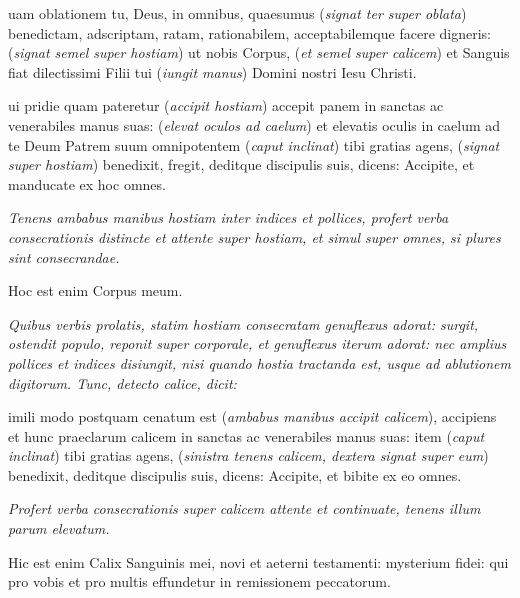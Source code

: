 uam oblationem tu, Deus, in omnibus, quaesumus (\textit{signat ter
super oblata}) bene\cross{}dictam, adscrip\cross{}tam, ra\cross{}tam,
rationabilem, acceptabilemque facere digneris: (\textit{signat semel super
hostiam}) ut nobis Cor\cross{}pus, (\textit{et semel super calicem}) et
San\cross{}guis fiat dilectissimi Filii tui (\textit{iungit manus}) Domini
nostri Iesu Christi.

ui pridie quam pateretur (\textit{accipit hostiam}) accepit panem
in sanctas ac venerabiles manus suas: (\textit{elevat oculos ad caelum}) et
elevatis oculis in caelum ad te Deum Patrem suum omnipotentem (\textit{caput
inclinat}) tibi gratias agens, (\textit{signat super hostiam})
bene\cross{}dixit, fregit, deditque discipulis suis, dicens: Accipite, et
manducate ex hoc omnes.

\textit{%
    Tenens ambabus manibus hostiam inter indices et pollices, profert verba
    consecrationis distincte et attente super hostiam, et simul super omnes, si
    plures sint consecrandae.
}


{\Large\centering Hoc est enim Corpus meum.\par}

\sinus\sinus\sinus

\textit{%
    Quibus verbis prolatis, statim hostiam consecratam genuflexus adorat:
    surgit, ostendit populo, reponit super corporale, et genuflexus iterum
    adorat: nec amplius pollices et indices disiungit, nisi quando hostia
    tractanda est, usque ad ablutionem digitorum.  Tunc, detecto calice, dicit:
}

imili modo postquam cenatum est (\textit{ambabus manibus accipit
calicem}), accipiens et hunc praeclarum calicem in sanctas ac venerabiles manus
suas: item (\textit{caput inclinat}) tibi gratias agens, (\textit{sinistra
tenens calicem, dextera signat super eum}) bene\cross{}dixit, deditque
discipulis suis, dicens: Accipite, et bibite ex eo omnes.

\textit{%
    Profert verba consecrationis super calicem attente et continuate, tenens
    illum parum elevatum.
}

{
    \Large\centering
    Hic est enim Calix Sanguinis mei, novi et aeterni testamenti: mysterium
    fidei: qui pro vobis et pro multis effundetur in remissionem peccatorum.
    \par
}

\sinus\sinus\sinus

